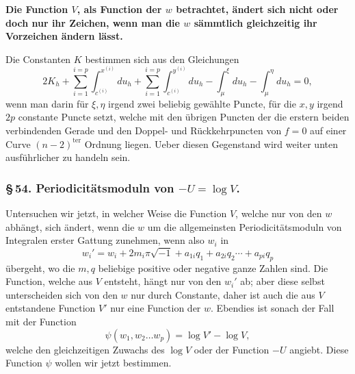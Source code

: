 \documentclass[10pt]{article}
\begin{document}
\textbf{Die Function \(V\), als Function der \(w\) betrachtet, ändert sich nicht oder doch nur ihr Zeichen, wenn man die \(w\) sämmtlich gleichzeitig ihr Vorzeichen ändern lässt.}

Die Constanten \(K\) bestimmen sich aus den Gleichungen
\[
2K_h+\sum_{i=1}^{i=p}\int_{c^{(i)}}^{x^{(i)}}du_h+\sum_{i=1}^{i=p}\int_{c^{(i)}}^{y^{(i)}}du_h-\int_{\mu}^{\xi}du_h-\int_{\mu}^{\eta}du_h=0,
\]
wenn man darin für \(\xi,\eta\) irgend zwei beliebig gewählte Puncte, für die \(x,y\) irgend \(2p\) constante Puncte setzt, welche mit den übrigen Puncten der die erstern beiden verbindenden Gerade und den Doppel- und Rückkehrpuncten von \(f=0\) auf einer Curve \((n-2)^{\mathrm{ter}}\) Ordnung liegen. Ueber diesen Gegenstand wird weiter unten ausführlicher zu handeln sein.

\subsubsection*{\S\,54. Periodicitätsmoduln von \(-U=\log V\).}

Untersuchen wir jetzt, in welcher Weise die Function \(V\), welche nur von den \(w\) abhängt, sich ändert, wenn die \(w\) um die allgemeinsten Periodicitätsmoduln von Integralen erster Gattung zunehmen, wenn also \(w_i\) in
\[
w_i'=w_i+2m_i\pi\sqrt{-1}+a_{1i}q_1+a_{2i}q_2\cdots+a_{pi}q_p
\]
übergeht, wo die \(m,q\) beliebige positive oder negative ganze Zahlen sind. Die Function, welche aus \(V\) entsteht, hängt nur von den \(w_i'\) ab; aber diese selbst unterscheiden sich von den \(w\) nur durch Constante, daher ist auch die aus \(V\) entstandene Function \(V'\) nur eine Function der \(w\). Ebendies ist sonach der Fall mit der Function
\[
\psi(w_1,w_2\ldots w_p)=\log V'-\log V,
\]
welche den gleichzeitigen Zuwachs des \(\log V\) oder der Function \(-U\) angiebt. Diese Function \(\psi\) wollen wir jetzt bestimmen.
\end{document}
